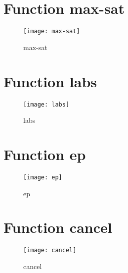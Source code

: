\section{Function max-sat}
\begin{center}

\end{center}
\begin{center}

\end{center}
\begin{figure}[h]
\centering
\begin{center}
\texttt{[image: max-sat]}
\caption{max-sat}
\end{center}
\end{figure}
\newpage
\section{Function labs}
\begin{center}

\end{center}
\begin{center}

\end{center}
\begin{figure}[h]
\centering
\begin{center}
\texttt{[image: labs]}
\caption{labs}
\end{center}
\end{figure}
\newpage
\section{Function ep}
\begin{center}

\end{center}
\begin{center}

\end{center}
\begin{figure}[h]
\centering
\begin{center}
\texttt{[image: ep]}
\caption{ep}
\end{center}
\end{figure}
\newpage
\section{Function cancel}
\begin{center}

\end{center}
\begin{center}

\end{center}
\begin{figure}[h]
\centering
\begin{center}
\texttt{[image: cancel]}
\caption{cancel}
\end{center}
\end{figure}
\newpage
